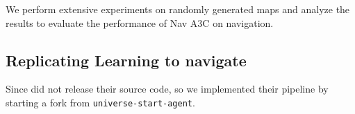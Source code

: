 We perform extensive experiments on randomly generated maps and analyze the results to evaluate the performance of Nav A3C on navigation.
% 
% 
% 
% 
% 
% 


\subsection{Replicating Learning to navigate}
Since \cite{MiPaViICLR2017} did not release their source code, so we implemented their pipeline by starting a fork from \texttt{universe-start-agent}\cite{OpenAI2017UniverseStarterAgent}.

